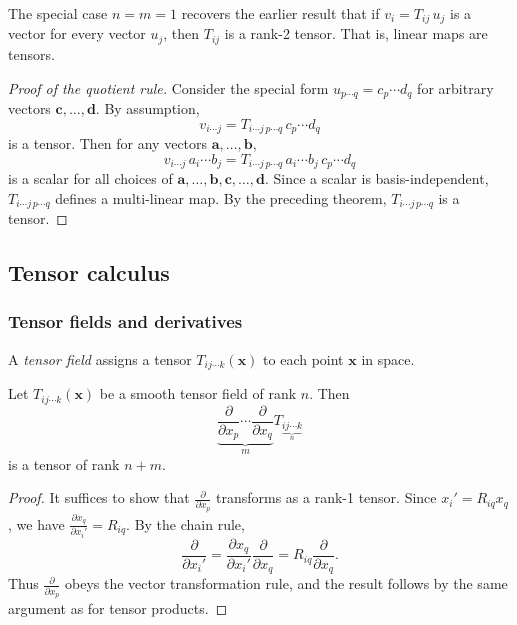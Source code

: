 \documentclass[a4paper]{article}
\begin{document}
\begin{rmk}
  The special case $n = m = 1$ recovers the earlier result that if $v_i = T_{ij}\,u_j$ is a vector for every vector $u_j$, then $T_{ij}$ is a rank-2 tensor. That is, linear maps are tensors.
\end{rmk}

\begin{proof}[Proof of the quotient rule]
  Consider the special form $u_{p \cdots q} = c_p \cdots d_q$ for arbitrary vectors $\mathbf{c}, \ldots, \mathbf{d}$. By assumption,
  \[
    v_{i\cdots j} = T_{i\cdots j\,p\cdots q}\,c_p\cdots d_q
  \]
  is a tensor. Then for any vectors $\mathbf{a}, \ldots, \mathbf{b}$,
  \[
    v_{i\cdots j}\,a_i \cdots b_j = T_{i\cdots j\,p\cdots q}\,a_i\cdots b_j\,c_p\cdots d_q
  \]
  is a scalar for all choices of $\mathbf{a}, \ldots, \mathbf{b}, \mathbf{c},\ldots, \mathbf{d}$. Since a scalar is basis-independent, $T_{i\cdots j\,p\cdots q}$ defines a multi-linear map. By the preceding theorem, $T_{i\cdots j\,p\cdots q}$ is a tensor.
\end{proof}


\subsection{Tensor calculus}
\subsubsection*{Tensor fields and derivatives}

\begin{defi}
  A \emph{tensor field} assigns a tensor $T_{ij\cdots k}(\mathbf{x})$ to each point $\mathbf{x}$ in space.
\end{defi}

\begin{prop}
  Let $T_{ij\cdots k}(\mathbf{x})$ be a smooth tensor field of rank $n$. Then
  \[
    \underbrace{\frac{\partial}{\partial x_p}\cdots \frac{\partial}{\partial x_q}}_{m}T_{\underbrace{ij\cdots k}_n}\tag{$*$}
  \]
  is a tensor of rank $n + m$.
\end{prop}

\begin{proof}
  It suffices to show that $\frac{\partial}{\partial x_p}$ transforms as a rank-1 tensor. Since $x_i' = R_{iq}x_q$, we have $\frac{\partial x_q}{\partial x_i'} = R_{iq}$. By the chain rule,
  \[
    \frac{\partial}{\partial x_i'} = \frac{\partial x_q}{\partial x_i'}\frac{\partial}{\partial x_q} = R_{iq} \frac{\partial}{\partial x_q}.
  \]
  Thus $\frac{\partial}{\partial x_p}$ obeys the vector transformation rule, and the result follows by the same argument as for tensor products.
\end{proof}
\end{document}
